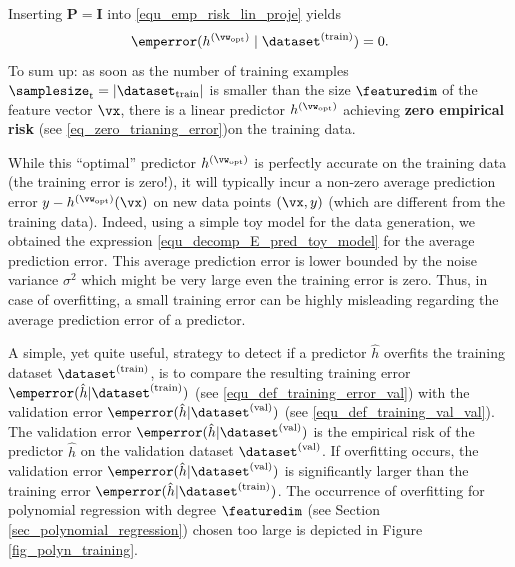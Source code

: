 \documentclass[12pt]{report}
\begin{document}
Inserting $\mathbf{P} = \mathbf{I}$ into \eqref{equ_emp_risk_lin_proje} yields 
\begin{equation}
\label{eq_zero_trianing_error}
\emperror(h^{(\vw_{\rm opt})} \mid \dataset^{(\rm train)}) = 0.
\end{equation} 
To sum up: as soon as the number of training examples $\samplesize_{\rm t} = | \dataset_{\rm train}|$ is smaller 
than the size $\featuredim$ of the feature vector $\vx$, there is a linear predictor $h^{(\vw_{\rm opt})}$ achieving 
{\bf zero empirical risk} (see \eqref{eq_zero_trianing_error})on the training data. 

While this ``optimal'' predictor $h^{(\vw_{\rm opt})}$ is perfectly accurate on the training 
data (the training error is zero!), it will typically incur a non-zero average prediction error 
$y - h^{(\vw_{\rm opt})}(\vx)$ on new data points $(\vx,y)$ (which are different from the 
training data). Indeed, using a simple toy model for the data generation, we obtained the 
expression \eqref{equ_decomp_E_pred_toy_model} for the average prediction error. This 
average prediction error is lower bounded by the noise variance $\sigma^{2}$ which might 
be very large even the training error is zero. Thus, in case of overfitting, a small training 
error can be highly misleading regarding the average prediction error of a predictor. 

A simple, yet quite useful, strategy to detect if a predictor $\hat{h}$ overfits the training 
dataset $\dataset^{(\rm train)}$, is to compare the resulting training error 
$\emperror(\hat{h}| \dataset^{(\rm train)})$ (see \eqref{equ_def_training_error_val}) with the 
validation error $\emperror(\hat{h}| \dataset^{(\rm val)})$ (see \eqref{equ_def_training_val_val}). 
The validation error $\emperror(\hat{h}| \dataset^{(\rm val)})$ is the empirical risk of the predictor 
$\hat{h}$ on the validation dataset $\dataset^{(\rm val)}$. If overfitting occurs, the validation 
error $\emperror(\hat{h}| \dataset^{(\rm val)})$ is significantly larger than the training error 
$\emperror(\hat{h}| \dataset^{(\rm train)})$. The occurrence of overfitting for polynomial regression with 
degree $\featuredim$ (see Section \ref{sec_polynomial_regression}) chosen too large is depicted in 
Figure \ref{fig_polyn_training}. 
\end{document}
